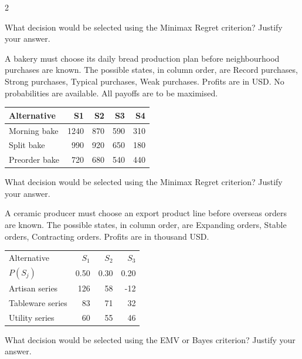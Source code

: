 \begin{multicols}{2}
\begin{minipage}{\linewidth}
What decision would be selected using the Minimax Regret criterion? Justify your answer. 
\end{minipage}\par

\begin{minipage}{\linewidth}
A bakery must choose its daily bread production plan before neighbourhood purchases are known. The possible states, in column order, are Record purchases, Strong purchases, Typical purchases, Weak purchases. Profits are in USD. No probabilities are available. All payoffs are to be maximised.
\begin{center}\small\setlength{\tabcolsep}{4pt}
\begin{tabular}{@{}lrrrr@{}}\toprule
Alternative&S1&S2&S3&S4\\\midrule
Morning bake&1240&870&590&310\\
Split bake&990&920&650&180\\
Preorder bake&720&680&540&440\\\bottomrule
\end{tabular}\end{center}

What decision would be selected using the Minimax Regret criterion? Justify your answer. 
\end{minipage}\par

\begin{minipage}{\linewidth}
A ceramic producer must choose an export product line before overseas orders are known. The possible states, in column order, are Expanding orders, Stable orders, Contracting orders. Profits are in thousand USD.
\begin{center}\small\setlength{\tabcolsep}{4pt}
\begin{tabular}{@{}lrrr@{}}\toprule
Alternative&$S_1$&$S_2$&$S_3$\\
$P(S_j)$&0.50&0.30&0.20\\\midrule
Artisan series&126&58&-12\\
Tableware series&83&71&32\\
Utility series&60&55&46\\\bottomrule
\end{tabular}\end{center}

What decision would be selected using the EMV or Bayes criterion? Justify your answer. 
\end{minipage}\par


\end{multicols}
